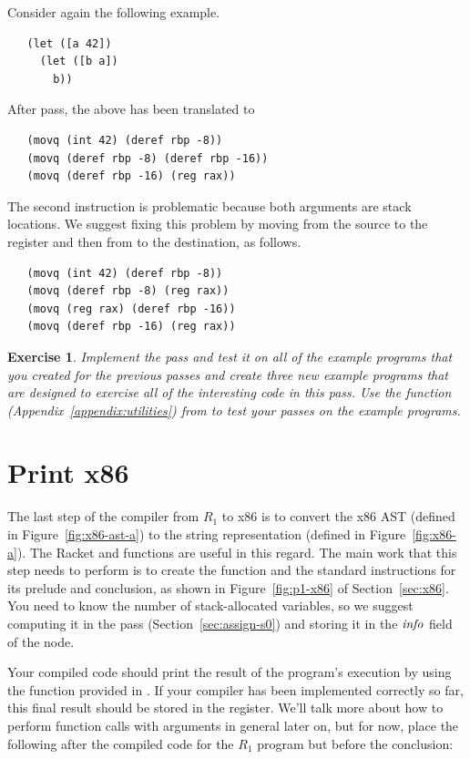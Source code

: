 \documentclass[11pt]{book}
\newtheorem{exercise}[theorem]{Exercise}
\begin{document}
Consider again the following example.
\begin{lstlisting}
   (let ([a 42])
     (let ([b a])
       b))
\end{lstlisting}
After  pass, the above has been translated to
\begin{lstlisting}
   (movq (int 42) (deref rbp -8))
   (movq (deref rbp -8) (deref rbp -16))
   (movq (deref rbp -16) (reg rax))
\end{lstlisting}
The second  instruction is problematic because both
arguments are stack locations. We suggest fixing this problem by
moving from the source to the register  and then from
 to the destination, as follows.
\begin{lstlisting}
   (movq (int 42) (deref rbp -8))
   (movq (deref rbp -8) (reg rax))
   (movq (reg rax) (deref rbp -16))
   (movq (deref rbp -16) (reg rax))
\end{lstlisting}

\begin{exercise}
\normalfont
Implement the  pass and test it on all of the
example programs that you created for the previous passes and create
three new example programs that are designed to exercise all of the
interesting code in this pass. Use the  function
(Appendix~\ref{appendix:utilities}) from  to test
your passes on the example programs.
\end{exercise}


\section{Print x86}
\label{sec:print-x86}

The last step of the compiler from $R_1$ to x86 is to convert the x86
AST (defined in Figure~\ref{fig:x86-ast-a}) to the string
representation (defined in Figure~\ref{fig:x86-a}). The Racket
 and  functions are useful in this
regard. The main work that this step needs to perform is to create the
 function and the standard instructions for its prelude and
conclusion, as shown in Figure~\ref{fig:p1-x86} of
Section~\ref{sec:x86}. You need to know the number of stack-allocated
variables, so we suggest computing it in the  pass
(Section~\ref{sec:assign-s0}) and storing it in the $\mathit{info}$ field
of the  node.

Your compiled code should print the result of the program's execution
by using the  function provided in
. If your compiler has been implemented correctly so
far, this final result should be stored in the  register.
We'll talk more about how to perform function calls with arguments in
general later on, but for now, place the following after the compiled
code for the $R_1$ program but before the conclusion:
\end{document}
